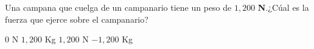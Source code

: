
\question Una campana que cuelga de un campanario tiene un peso de $1,200$
          \textbf{N}.¿Cúal es la fuerza que ejerce sobre el campanario?

  \begin{oneparchoices}
    \choice $0$ N
    \choice $1,200$ Kg
    \CorrectChoice $1,200$ N
    \choice $-1,200$ Kg
  \end{oneparchoices}
